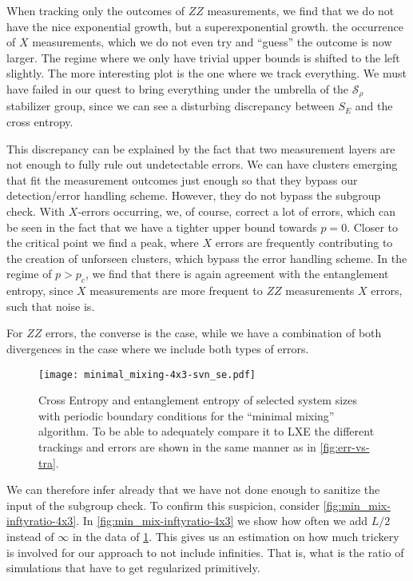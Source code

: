 When tracking only the outcomes of $ZZ$ measurements, we find that we do not
have the nice exponential growth, but a superexponential growth.  the
occurrence of $X$ measurements, which we do not even try and \enquote{guess}
the outcome is now larger.  The regime where we only have trivial upper bounds
is shifted to the left slightly.  The more interesting plot is the one where we
track everything.  We must have failed in our quest to bring everything under
the umbrella of the $\mathcal{S}_\rho$ stabilizer group, since we can see a
disturbing discrepancy between $S_E$ and the cross entropy.
  
This discrepancy can be explained by the fact that two measurement layers are
not enough to fully rule out undetectable errors. We can have clusters emerging
that fit the measurement outcomes just enough so that they bypass our
detection/error handling scheme.  However, they do not bypass the subgroup
check. With $X$-errors occurring, we, of course, correct a lot of errors, which
can be seen in the fact that we have a tighter upper bound towards $p=0$.
Closer to the critical point we find a peak, where $X$ errors are frequently
contributing to the creation of unforseen clusters, which bypass the error
handling scheme.  In the regime of $p > p_c$, we find that there is again
agreement with the entanglement entropy, since $X$ measurements are more
frequent to $ZZ$ measurements $X$ errors, such that noise is.

For $ZZ$ errors, the converse is the case, while we have a combination of both
divergences in the case where we include both types of errors.

\begin{figure}[p]
  \centering
  \texttt{[image: minimal\_mixing-4x3-svn\_se.pdf]}
  \caption{Cross Entropy and entanglement entropy of selected system sizes with
    periodic boundary conditions for the \enquote{minimal mixing} algorithm. 
  To be able to adequately compare it to LXE the
different trackings and errors are shown in the same manner as in
\cref{fig:err-vs-tra}.}
  \label{fig:min_mix-svn_se-4x3}
\end{figure}

We can therefore infer already that we have not done enough to sanitize the
input of the subgroup check. To confirm this suspicion, consider
\cref{fig:min_mix-inftyratio-4x3}.  In \cref{fig:min_mix-inftyratio-4x3} we
show how often we add $L /2$ instead of $\infty$ in the data of
\cref{fig:min_mix-svn_se-4x3}.  This gives us an estimation on how much
trickery is involved for our approach to not include infinities. That is, what
is the ratio of simulations that have to get regularized primitively.
 
